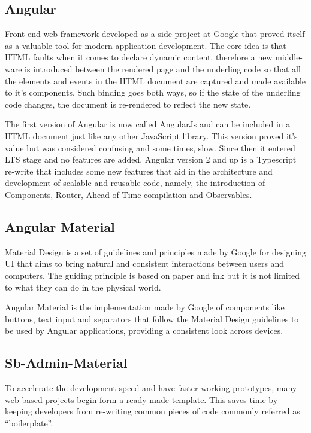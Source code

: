 \subsection{Angular}
Front-end web framework developed as a side project at Google that proved itself as a valuable tool for modern application development. The core idea is that \gls{HTML} faults when it comes to declare dynamic content\cite{angularjs}, therefore a new middle-ware is introduced between the rendered page and the underling code so that all the elements and events in the \gls{HTML} document are captured and made available to it's components. Such binding goes both ways, so if the state of the underling code changes, the document is re-rendered to reflect the new state.

The first version of Angular is now called AngularJs and can be included in a \gls{HTML} document just like any other JavaScript library. This version proved it's value but was considered confusing and some times, slow. Since then it entered \gls{LTS} stage and no features are added. Angular version 2 and up is a Typescript re-write that includes some new features that aid in the architecture and development of scalable and reusable code, namely, the introduction of Components, Router, Ahead-of-Time compilation and Observables\cite{angular}.

\subsection{Angular Material}
Material Design is a set of guidelines and principles made by Google for designing \gls{UI} that aims to bring natural and consistent interactions between users and computers. The guiding principle is based on paper and ink but it is not limited to what they can do in the physical world\cite{materialdesign}.

Angular Material\cite{angularmaterial} is the implementation made by Google of components like buttons, text input and separators that follow the Material Design guidelines to be used by Angular applications, providing a consistent look across devices.

\subsection{Sb-Admin-Material}
To accelerate the development speed and have faster working prototypes, many web-based projects begin form a ready-made template. This saves time by keeping developers from re-writing common pieces of code commonly referred as ``boilerplate''.

